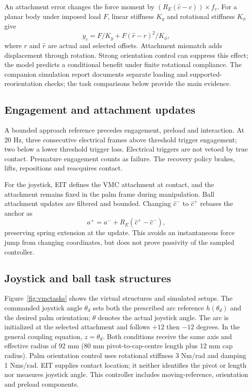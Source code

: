 \documentclass[letterpaper,10pt,conference]{IEEEtran}
\begin{document}
An attachment error changes the force moment by $(R_E(\hat c-c))\times f_v$. For a planar body under imposed load $F$, linear stiffness $K_y$ and rotational stiffness $K_\phi$ give
\begin{equation}
 y_c=F/K_y+F(\hat r-r)^2/K_\phi,
 \label{eq:bias}
\end{equation}
where $r$ and $\hat r$ are actual and selected offsets. Attachment mismatch adds displacement through rotation. Strong orientation control can suppress this effect; the model predicts a conditional benefit under finite rotational compliance. The companion simulation report documents separate loading and supported-reorientation checks; the task comparisons below provide the main evidence.

\subsection{Engagement and attachment updates}
A bounded approach reference precedes engagement, preload and interaction. At 20 Hz, three consecutive electrical frames above threshold trigger engagement; two below a lower threshold trigger loss. Electrical triggers are not vetoed by true contact. Premature engagement counts as failure. The recovery policy brakes, lifts, repositions and reacquires contact.

For the joystick, EIT defines the VMC attachment at contact, and the attachment remains fixed in the palm frame during manipulation. Ball attachment updates are filtered and bounded. Changing $\hat c^-$ to $\hat c^+$ rebases the anchor as
\begin{equation}
 a^+=a^-+R_E(\hat c^+-\hat c^-),
\end{equation}
preserving spring extension at the update. This avoids an instantaneous force jump from changing coordinates, but does not prove passivity of the sampled controller.

\subsection{Joystick and ball task structures}
Figure~\ref{fig:vmctasks} shows the virtual structures and simulated setups. The commanded joystick angle $\theta_d$ sets both the prescribed arc reference $h(\theta_d)$ and the desired palm orientation; $\theta$ denotes the actual joystick angle. The arc is initialized at the selected attachment and follows $+12$ then $-12$ degrees. In the general coupling equation, $z=\theta_d$. Both conditions receive the same axis and effective radius of 92 mm (80 mm pivot-to-cap-centre length plus 12 mm cap radius). Palm orientation control uses rotational stiffness 3 Nm/rad and damping 1 Nms/rad. EIT supplies contact location; it neither identifies the pivot or length nor measures joystick angle. This controller includes moving-reference, orientation and preload components.
\end{document}
